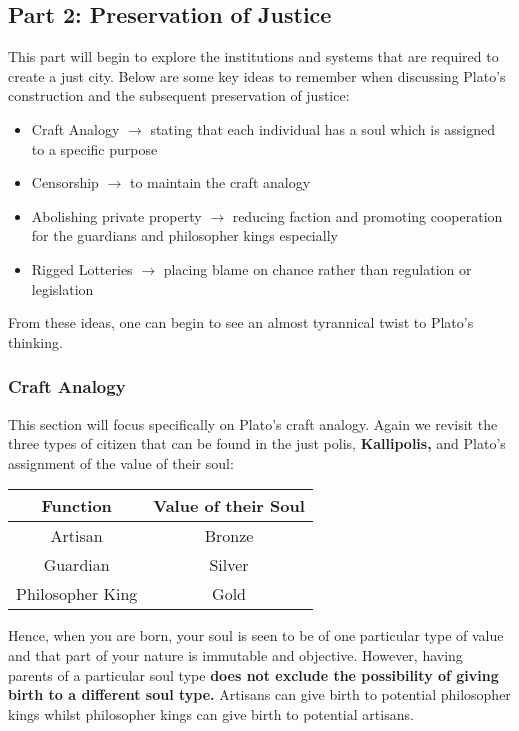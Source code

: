 \documentclass[12pt, letterpaper]{article}
\begin{document}
\subsection{Part 2: Preservation of Justice}
This part will begin to explore the institutions and systems that are required to create a just city. Below are some key ideas to remember when discussing Plato's construction and the subsequent preservation of justice:
\begin{itemize}
	\item Craft Analogy $\rightarrow$ stating that each individual has a soul which is assigned to a specific purpose
	\item Censorship $\rightarrow$ to maintain the craft analogy
	\item Abolishing private property $\rightarrow$ reducing faction and promoting cooperation for the guardians and philosopher kings especially
	\item Rigged Lotteries $\rightarrow$ placing blame on chance rather than regulation or legislation
\end{itemize}
From these ideas, one can begin to see an almost tyrannical twist to Plato's thinking.

\subsubsection{Craft Analogy}
This section will focus specifically on Plato's craft analogy. Again we revisit the three types of citizen that can be found in the just polis, \textbf{Kallipolis,} and Plato's assignment of the value of their soul:
\begin{center}
	\begin{tabular}{c|c}
		\textbf{Function} & \textbf{Value of their Soul}\\
		\hline
		Artisan & Bronze\\
		\hline
		Guardian & Silver\\
		\hline
		Philosopher King & Gold\\
		\hline
	\end{tabular}
\end{center}
Hence, when you are born, your soul is seen to be of one particular type of value and that part of your nature is immutable and objective. However, having parents of a particular soul type \textbf{does not exclude the possibility of giving birth to a different soul type.} Artisans can give birth to potential philosopher kings whilst philosopher kings can give birth to potential artisans.
\end{document}

